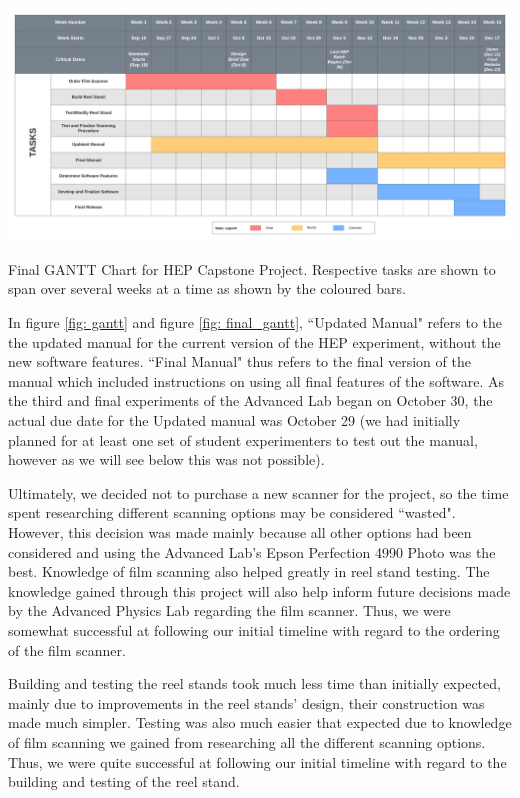 \documentclass[12pt]{article} %
\begin{document}
\begin{SidewaysFigure}
    \includegraphics[width = 1.0\linewidth]{Images/Final Gantt chart - HEP.png} 
    \caption{Final GANTT Chart for HEP Capstone Project. Respective tasks are shown to span over several weeks at a time as shown by the coloured bars.}
    \label{fig: final_gantt}
\end{SidewaysFigure}

In figure \ref{fig: gantt} and figure \ref{fig: final_gantt}, ``Updated Manual" refers to the the updated manual for the current version of the HEP experiment, without the new software features. ``Final Manual" thus refers to the final version of the manual which included instructions on using all final features of the software. As the third and final experiments of the Advanced Lab began on October 30, the actual due date for the Updated manual was October 29 (we had initially planned for at least one set of student experimenters to test out the manual, however as we will see below this was not possible).

Ultimately, we decided not to purchase a new scanner for the project, so the time spent researching different scanning options may be considered ``wasted". However, this decision was made mainly because all other options had been considered and using the Advanced Lab's Epson Perfection 4990 Photo was the best. Knowledge of film scanning also helped greatly in reel stand testing. The knowledge gained through this project will also help inform future decisions made by the Advanced Physics Lab regarding the film scanner. Thus, we were somewhat successful at following our initial timeline with regard to the ordering of the film scanner. 

Building and testing the reel stands took much less time than initially expected, mainly due to improvements in the reel stands' design, their construction was made much simpler. Testing was also much easier that expected due to knowledge of film scanning we gained from researching all the different scanning options. Thus, we were quite successful at following our initial timeline with regard to the building and testing of the reel stand. 
\end{document}
